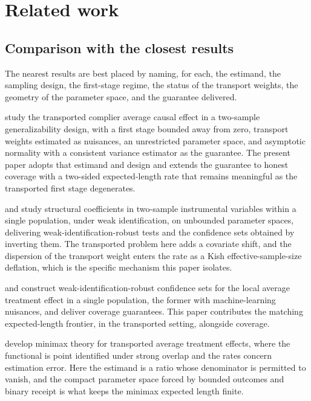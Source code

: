 \section{Related work}

\subsection{Comparison with the closest results}

The nearest results are best placed by naming, for each, the estimand, the sampling design, the
first-stage regime, the status of the transport weights, the geometry of the parameter space, and the
guarantee delivered.

\citet{ChenHuang2025} study the transported complier average causal effect in a two-sample
generalizability design, with a first stage bounded away from zero, transport weights estimated as
nuisances, an unrestricted parameter space, and asymptotic normality with a consistent variance
estimator as the guarantee. The present paper adopts that estimand and design and extends the
guarantee to honest coverage with a two-sided expected-length rate that remains meaningful as the
transported first stage degenerates.

\citet{ChoiGuShen2018} and \citet{ChoiShen2019} study structural coefficients in two-sample
instrumental variables within a single population, under weak identification, on unbounded parameter
spaces, delivering weak-identification-robust tests and the confidence sets obtained by inverting them.
The transported problem here adds a covariate shift, and the dispersion of the transport weight enters
the rate as a Kish effective-sample-size deflation, which is the specific mechanism this paper isolates.

\citet{Ma2023} and \citet{SmuclerLanniMasip2025} construct weak-identification-robust confidence sets
for the local average treatment effect in a single population, the former with machine-learning
nuisances, and deliver coverage guarantees. This paper contributes the matching expected-length
frontier, in the transported setting, alongside coverage.

\citet{ZengKennedyBodnarNaimi2024} develop minimax theory for transported average treatment effects,
where the functional is point identified under strong overlap and the rates concern estimation error.
Here the estimand is a ratio whose denominator is permitted to vanish, and the compact parameter space
forced by bounded outcomes and binary receipt is what keeps the minimax expected length finite.


